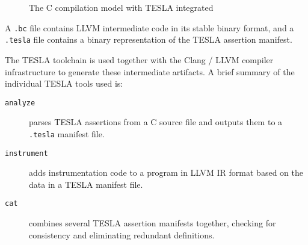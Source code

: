 \begin{figure}[ht]
  \centering
  \caption{The C compilation model with TESLA integrated}
  \label{fig:c-tesla-compilation}
\end{figure}

A \texttt{.bc} file contains LLVM intermediate code in its stable binary format,
and a \texttt{.tesla} file contains a binary representation of the TESLA
assertion manifest.

The TESLA toolchain is used together with the Clang / LLVM compiler
infrastructure to generate these intermediate artifacts. A brief summary of the
individual TESLA tools used is:

\begin{description}
  \item[\texttt{analyze}] parses TESLA assertions from a C source file and
    outputs them to a \texttt{.tesla} manifest file.
  \item[\texttt{instrument}] adds instrumentation code to a program in LLVM IR
    format based on the data in a TESLA manifest file.
  \item[\texttt{cat}] combines several TESLA assertion manifests together,
    checking for consistency and eliminating redundant definitions.
\end{description}

